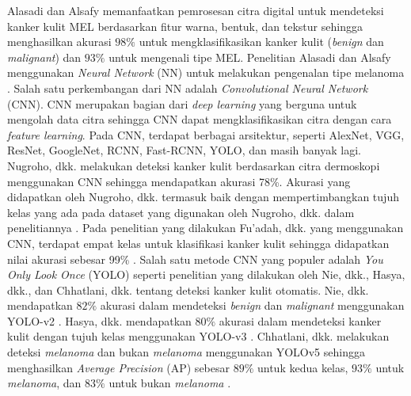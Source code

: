     Alasadi dan Alsafy memanfaatkan pemrosesan citra digital untuk mendeteksi kanker kulit MEL berdasarkan fitur warna, bentuk, dan tekstur sehingga menghasilkan akurasi $98\%$ untuk mengklasifikasikan kanker kulit (\textit{benign} dan \textit{malignant}) dan $93\%$ untuk mengenali tipe MEL. Penelitian Alasadi dan Alsafy menggunakan \textit{Neural Network} (NN) untuk melakukan pengenalan tipe melanoma \citep{Alasadi2015a}. Salah satu perkembangan dari NN adalah \textit{Convolutional Neural Network} (CNN). CNN merupakan bagian dari \textit{deep learning} yang berguna untuk mengolah data citra sehingga CNN dapat mengklasifikasikan citra dengan cara \textit{feature learning}. Pada CNN, terdapat berbagai arsitektur, seperti AlexNet, VGG, ResNet, GoogleNet, RCNN, Fast-RCNN, YOLO, dan masih banyak lagi. Nugroho, dkk. melakukan deteksi kanker kulit berdasarkan citra dermoskopi menggunakan CNN sehingga mendapatkan akurasi 78\%. Akurasi yang didapatkan oleh Nugroho, dkk. termasuk baik dengan mempertimbangkan tujuh kelas yang ada pada dataset yang digunakan oleh Nugroho, dkk. dalam penelitiannya \citep{Nugroho2019}. Pada penelitian yang dilakukan Fu’adah, dkk. yang menggunakan CNN, terdapat empat kelas untuk klasifikasi kanker kulit sehingga didapatkan nilai akurasi sebesar 99\% \citep{Fuadah2020a}. Salah satu metode CNN yang populer adalah \textit{You Only Look Once} (YOLO) seperti penelitian yang dilakukan oleh Nie, dkk., Hasya, dkk., dan Chhatlani, dkk. tentang deteksi kanker kulit otomatis. Nie, dkk. mendapatkan $82\%$ akurasi dalam mendeteksi \textit{benign} dan \textit{malignant} menggunakan YOLO-v2 \citep{Nie2019a}. Hasya, dkk. mendapatkan $80\%$ akurasi dalam mendeteksi kanker kulit dengan tujuh kelas menggunakan YOLO-v3 \citep{Hasya2021}. Chhatlani, dkk. melakukan deteksi \textit{melanoma} dan bukan \textit{melanoma} menggunakan YOLOv5 sehingga menghasilkan \textit{Average Precision} (AP) sebesar $89\%$ untuk kedua kelas, $93\%$ untuk \textit{melanoma}, dan $83\%$ untuk bukan \textit{melanoma} \citep{Chhatlani2022a}.

